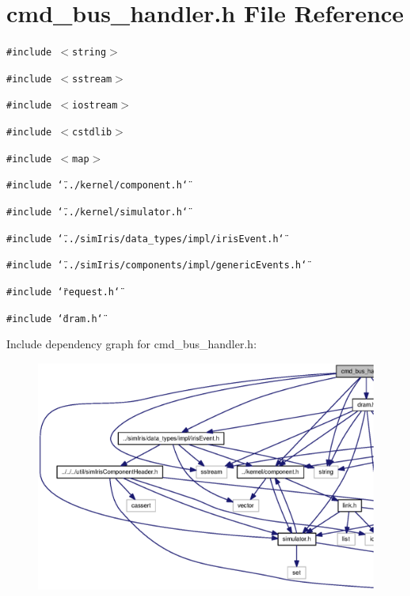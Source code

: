 \section{cmd\_\-bus\_\-handler.h File Reference}
\label{cmd__bus__handler_8h}
{\tt \#include $<$string$>$}\par
{\tt \#include $<$sstream$>$}\par
{\tt \#include $<$iostream$>$}\par
{\tt \#include $<$cstdlib$>$}\par
{\tt \#include $<$map$>$}\par
{\tt \#include \char`\"{}../kernel/component.h\char`\"{}}\par
{\tt \#include \char`\"{}../kernel/simulator.h\char`\"{}}\par
{\tt \#include \char`\"{}../simIris/data\_\-types/impl/irisEvent.h\char`\"{}}\par
{\tt \#include \char`\"{}../simIris/components/impl/genericEvents.h\char`\"{}}\par
{\tt \#include \char`\"{}request.h\char`\"{}}\par
{\tt \#include \char`\"{}dram.h\char`\"{}}\par


Include dependency graph for cmd\_\-bus\_\-handler.h:\nopagebreak
\begin{figure}[H]
\begin{center}
\leavevmode
\includegraphics[width=420pt]{cmd__bus__handler_8h__incl}
\end{center}
\end{figure}


